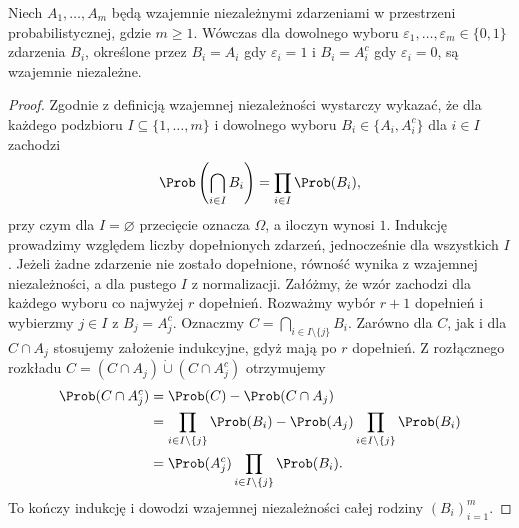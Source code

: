 \begin{lemat}
Niech $A_1,\ldots,A_m$ będą wzajemnie niezależnymi
zdarzeniami w przestrzeni probabilistycznej, gdzie $m\geq1$.
Wówczas dla dowolnego wyboru $\varepsilon_1,\ldots,\varepsilon_m
\in\{0,1\}$ zdarzenia $B_i$, określone przez
$B_i=A_i$ gdy $\varepsilon_i=1$ i $B_i=A_i^c$
gdy $\varepsilon_i=0$, są wzajemnie niezależne.
\end{lemat}
\begin{proof}
Zgodnie z definicją wzajemnej niezależności wystarczy wykazać,
że dla każdego podzbioru
$I\subseteq\{1,\ldots,m\}$ i dowolnego wyboru $B_i\in\{A_i,A_i^c\}$
dla $i\in I$ zachodzi
\[
\Prob\left(\bigcap_{i\in I} B_i\right)=\prod_{i\in I}\Prob(B_i),
\]
przy czym dla $I=\varnothing$ przecięcie oznacza $\Omega$,
a iloczyn wynosi $1$. Indukcję prowadzimy względem liczby
dopełnionych zdarzeń, jednocześnie dla wszystkich $I$.
Jeżeli żadne zdarzenie nie zostało dopełnione, równość wynika
z wzajemnej niezależności, a dla pustego $I$ z normalizacji.
Załóżmy, że wzór zachodzi dla każdego wyboru co najwyżej $r$
dopełnień. Rozważmy wybór $r+1$ dopełnień i wybierzmy
$j\in I$ z $B_j=A_j^c$. Oznaczmy
$C=\bigcap_{i\in I\setminus\{j\}}B_i$.
Zarówno dla $C$, jak i dla $C\cap A_j$ stosujemy założenie
indukcyjne, gdyż mają po $r$ dopełnień. Z rozłącznego rozkładu
$C=(C\cap A_j)\mathbin{\dot\cup}(C\cap A_j^c)$ otrzymujemy
\begin{align*}
\Prob(C\cap A_j^c)
&=\Prob(C)-\Prob(C\cap A_j)\\
&=\prod_{i\in I\setminus\{j\}}\Prob(B_i)
 -\Prob(A_j)\prod_{i\in I\setminus\{j\}}\Prob(B_i)\\
&=\Prob(A_j^c)\prod_{i\in I\setminus\{j\}}\Prob(B_i).
\end{align*}
To kończy indukcję i dowodzi wzajemnej niezależności
całej rodziny $(B_i)_{i=1}^m$.
\end{proof}

